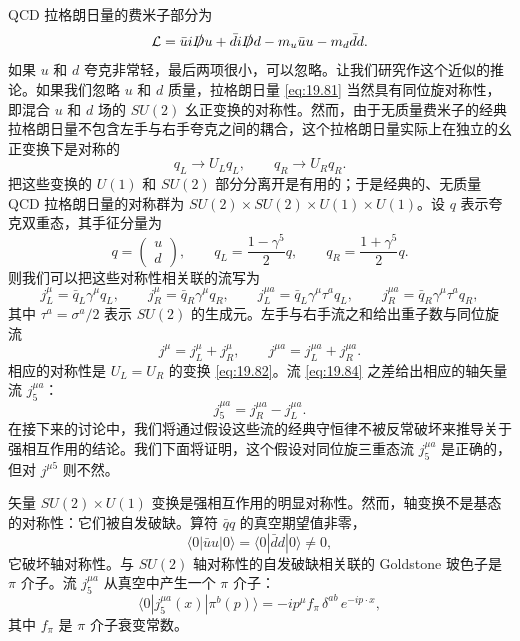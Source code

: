 QCD 拉格朗日量的费米子部分为
\begin{equation}
  \mathcal{L} = \bar{u}i\slashed{D}u + \bar{d}i\slashed{D}d
    - m_u\bar{u}u - m_d\bar{d}d .
  \label{eq:19.81}
\end{equation}
如果 $u$ 和 $d$ 夸克非常轻，最后两项很小，可以忽略。让我们研究作这个近似的推论。如果我们忽略 $u$ 和 $d$ 质量，拉格朗日量 \eqref{eq:19.81} 当然具有同位旋对称性，即混合 $u$ 和 $d$ 场的 $SU(2)$ 幺正变换的对称性。然而，由于无质量费米子的经典拉格朗日量不包含左手与右手夸克之间的耦合，这个拉格朗日量实际上在独立的幺正变换下是对称的
\begin{equation}
  q_L \to U_L q_L,\qquad q_R \to U_R q_R .
  \label{eq:19.82}
\end{equation}
把这些变换的 $U(1)$ 和 $SU(2)$ 部分分离开是有用的；于是经典的、无质量 QCD 拉格朗日量的对称群为 $SU(2)\times SU(2)\times U(1)\times U(1)$。设 $q$ 表示夸克双重态，其手征分量为
\begin{equation}
  q = \begin{pmatrix}u\\ d\end{pmatrix},\qquad
  q_L = \frac{1-\gamma^5}{2}q,\qquad q_R = \frac{1+\gamma^5}{2}q .
  \label{eq:19.83}
\end{equation}
则我们可以把这些对称性相关联的流写为
\begin{equation}
  j^\mu_L = \bar{q}_L\gamma^\mu q_L,\qquad j^\mu_R = \bar{q}_R\gamma^\mu q_R,
  \qquad j^{\mu a}_L = \bar{q}_L\gamma^\mu\tau^a q_L,\qquad
  j^{\mu a}_R = \bar{q}_R\gamma^\mu\tau^a q_R ,
  \label{eq:19.84}
\end{equation}
其中 $\tau^a = \sigma^a/2$ 表示 $SU(2)$ 的生成元。左手与右手流之和给出重子数与同位旋流
\begin{equation}
  j^\mu = j^\mu_L + j^\mu_R,\qquad j^{\mu a} = j^{\mu a}_L + j^{\mu a}_R .
  \label{eq:19.85}
\end{equation}
相应的对称性是 $U_L = U_R$ 的变换 \eqref{eq:19.82}。流 \eqref{eq:19.84} 之差给出相应的轴矢量流 $j^{\mu a}_5$：
\begin{equation}
  j^{\mu a}_5 = j^{\mu a}_R - j^{\mu a}_L .
  \label{eq:19.86}
\end{equation}
在接下来的讨论中，我们将通过假设这些流的经典守恒律不被反常破坏来推导关于强相互作用的结论。我们下面将证明，这个假设对同位旋三重态流 $j^{\mu a}_5$ 是正确的，但对 $j^{\mu 5}$ 则不然。

矢量 $SU(2)\times U(1)$ 变换是强相互作用的明显对称性。然而，轴变换不是基态的对称性：它们被自发破缺。算符 $\bar{q}q$ 的真空期望值非零，
\begin{equation}
  \langle 0|\bar{u}u|0\rangle = \langle 0|\bar{d}d|0\rangle \neq 0 ,
  \label{eq:19.87}
\end{equation}
它破坏轴对称性。与 $SU(2)$ 轴对称性的自发破缺相关联的 Goldstone 玻色子是 $\pi$ 介子。流 $j^{\mu a}_5$ 从真空中产生一个 $\pi$ 介子：
\begin{equation}
  \langle 0|j^{\mu a}_5(x)|\pi^b(p)\rangle = -ip^\mu f_\pi\,\delta^{ab}\,
    e^{-ip\cdot x} ,
  \label{eq:19.88}
\end{equation}
其中 $f_\pi$ 是 $\pi$ 介子衰变常数。

